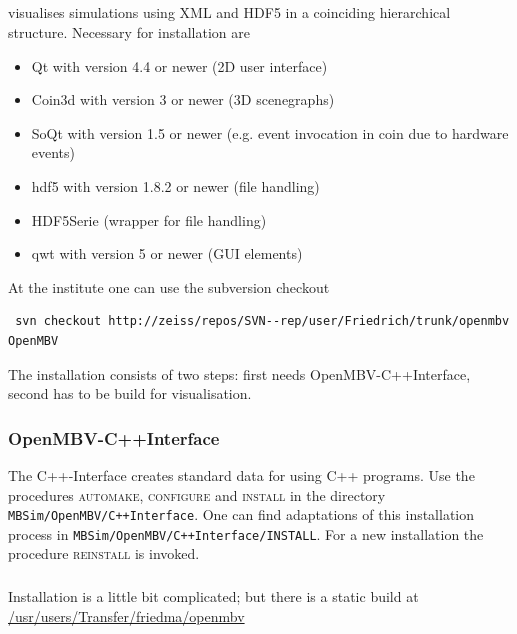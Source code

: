 \subsection{\OpenMBV{}}
\OpenMBV{} visualises \MBSim{} simulations using XML and HDF5 in a coinciding hierarchical structure. Necessary for installation are
\begin{itemize}
\item Qt with version 4.4 or newer (2D user interface)
\item Coin3d with version 3 or newer (3D scenegraphs)
\item SoQt with version 1.5 or newer (e.g. event invocation in coin due to hardware events)
\item hdf5 with version 1.8.2 or newer (file handling) 
\item HDF5Serie (wrapper for file handling)
\item qwt with version 5 or newer (GUI elements)
\end{itemize}

{\small At the institute one can use the subversion checkout
\begin{verbatim}
 svn checkout http://zeiss/repos/SVN--rep/user/Friedrich/trunk/openmbv OpenMBV
\end{verbatim}
}

The installation consists of two steps: first \MBSim{} needs \textsf{OpenMBV-C++Interface}, second \OpenMBV{} has to be build for visualisation. 

\subsubsection{OpenMBV-C++Interface}
The C++-Interface creates standard data for \OpenMBV{} using C++ programs. Use the procedures \textsc{automake, configure} and \textsc{install} in the directory \texttt{MBSim/OpenMBV/C++Interface}. One can find adaptations of this installation process in \texttt{MBSim/OpenMBV/C++Interface/INSTALL}.  For a new installation the procedure \textsc{reinstall} is invoked.

\subsubsection{\OpenMBV{}}
{\small Installation is a little bit complicated; but there is a static build at\\
  \url{/usr/users/Transfer/friedma/openmbv}
}

